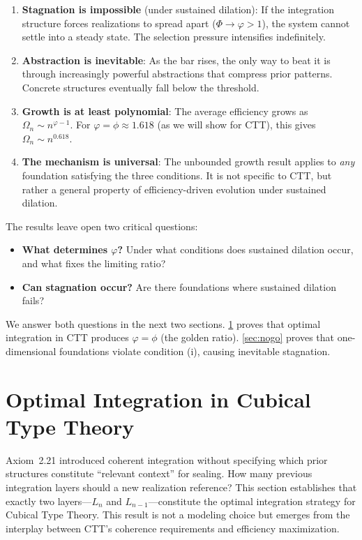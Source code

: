 \documentclass[11pt]{article}
\theoremstyle{definition}
\theoremstyle{remark}
\begin{document}
\begin{enumerate}
\item \textbf{Stagnation is impossible} (under sustained dilation): If the integration structure forces realizations to spread apart ($\Phi \to \varphi > 1$), the system cannot settle into a steady state. The selection pressure intensifies indefinitely.

\item \textbf{Abstraction is inevitable}: As the bar rises, the only way to beat it is through increasingly powerful abstractions that compress prior patterns. Concrete structures eventually fall below the threshold.

\item \textbf{Growth is at least polynomial}: The average efficiency grows as $\Omega_n \sim n^{\varphi - 1}$. For $\varphi = \phi \approx 1.618$ (as we will show for CTT), this gives $\Omega_n \sim n^{0.618}$.

\item \textbf{The mechanism is universal}: The unbounded growth result applies to \emph{any} foundation satisfying the three conditions. It is not specific to CTT, but rather a general property of efficiency-driven evolution under sustained dilation.
\end{enumerate}

The results leave open two critical questions:
\begin{itemize}
\item \textbf{What determines $\varphi$?} Under what conditions does sustained dilation occur, and what fixes the limiting ratio?
\item \textbf{Can stagnation occur?} Are there foundations where sustained dilation fails?
\end{itemize}

We answer both questions in the next two sections. \cref{sec:optimality} proves that optimal integration in CTT produces $\varphi = \phi$ (the golden ratio). \cref{sec:nogo} proves that one-dimensional foundations violate condition (i), causing inevitable stagnation.

\section{Optimal Integration in Cubical Type Theory}
\label{sec:optimality}

Axiom~2.21 introduced coherent integration without specifying which prior structures constitute
``relevant context'' for sealing. How many previous integration layers should a new realization reference? This section establishes that exactly two layers---$L_n$ and $L_{n-1}$---constitute the optimal
integration strategy for Cubical Type Theory. This result is not a modeling choice but emerges
from the interplay between CTT's coherence requirements and efficiency maximization.
\end{document}
